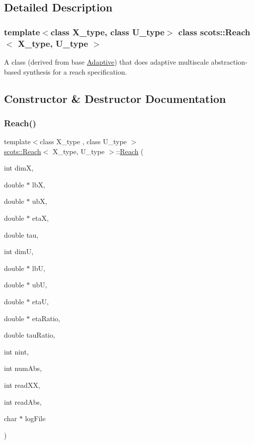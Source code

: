 \subsection{Detailed Description}
\subsubsection*{template$<$class X\+\_\+type, class U\+\_\+type$>$\newline
class scots\+::\+Reach$<$ X\+\_\+type, U\+\_\+type $>$}

A class (derived from base \hyperlink{classscots_1_1Adaptive}{Adaptive}) that does adaptive multiscale abstraction-\/based synthesis for a reach specification. 

\subsection{Constructor \& Destructor Documentation}
\mbox{\label{classscots_1_1Reach_ac61b7e746e55013c48de47eb3dc00ff7}} 
\subsubsection{\texorpdfstring{Reach()}{Reach()}}
{\footnotesize\ttfamily template$<$class X\+\_\+type , class U\+\_\+type $>$ \\
\hyperlink{classscots_1_1Reach}{scots\+::\+Reach}$<$ X\+\_\+type, U\+\_\+type $>$\+::\hyperlink{classscots_1_1Reach}{Reach} (\begin{DoxyParamCaption}\item[{int}]{dimX,  }\item[{double $\ast$}]{lbX,  }\item[{double $\ast$}]{ubX,  }\item[{double $\ast$}]{etaX,  }\item[{double}]{tau,  }\item[{int}]{dimU,  }\item[{double $\ast$}]{lbU,  }\item[{double $\ast$}]{ubU,  }\item[{double $\ast$}]{etaU,  }\item[{double $\ast$}]{eta\+Ratio,  }\item[{double}]{tau\+Ratio,  }\item[{int}]{nint,  }\item[{int}]{num\+Abs,  }\item[{int}]{read\+XX,  }\item[{int}]{read\+Abs,  }\item[{char $\ast$}]{log\+File }\end{DoxyParamCaption})\hspace{0.3cm}{\ttfamily [inline]}}

